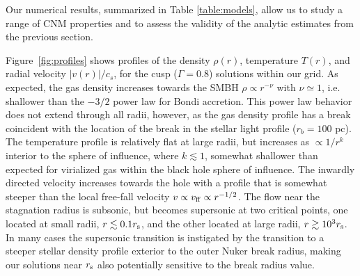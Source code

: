 \documentclass[usenatbib,fleqn]{mn2e}
\newcommand{\rb}{r_b}
\newcommand{\Mbh}[1][]{M_{\bullet#1}}
\newcommand{\densSlope}{\nu}
\begin{document}

Our numerical results, summarized in Table \ref{table:models}, allow
us to study a range of CNM properties and to assess the validity of
the analytic estimates from the previous section.  

Figure~\ref{fig:profiles} shows profiles of the density $\rho(r)$,
temperature $T(r)$, and radial velocity $|v(r)|/c_s$, for the cusp ($\Gamma=0.8$) solutions within our
grid.  As expected, the gas density increases towards the SMBH
$\rho\propto r^{-\densSlope}$ with $\densSlope\simeq1$, i.e. shallower
than the $-3/2$ power law for Bondi accretion. This power law behavior
does not extend through all radii, however, as the gas density profile
has a break coincident with the location of the break in the stellar
light profile ($\rb=100$ pc). The temperature profile is relatively
flat at large radii, but increases as $\propto 1/r^{k}$ interior to
the sphere of influence, where $k\lesssim 1$, somewhat shallower than
expected for virialized gas within the black hole sphere of influence.
The inwardly directed velocity increases towards the hole with a
profile that is somewhat steeper than the local free-fall velocity $v
\propto v_{\rm ff}\propto r^{-1/2}$.  The flow near the stagnation
radius is subsonic, but becomes supersonic at two critical points, one
located at small radii, $r \lesssim 0.1r_{\rm s}$, and the other
located at large radii, $r \gtrsim 10^{3}r_{\rm s}$.  In many cases
the supersonic transition is instigated by the transition to a steeper
stellar density profile exterior to the outer Nuker break radius,
making our solutions near $r_{\rm s}$ also potentially sensitive to
the break radius value.
\end{document}
